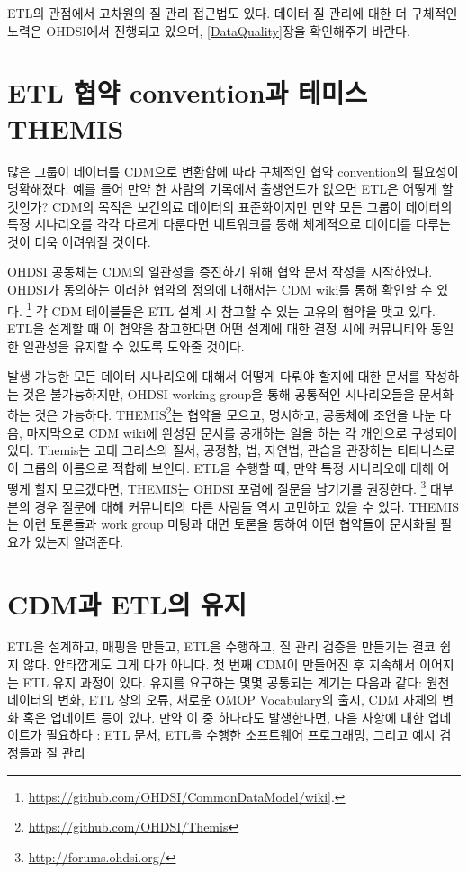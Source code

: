\documentclass[11pt]{book}
\let\rmarkdownfootnote\footnote%
\def\footnote{\protect\rmarkdownfootnote}
\theoremstyle{definition}
\theoremstyle{definition}
\theoremstyle{definition}
\theoremstyle{remark}
\begin{document}
ETL의 관점에서 고차원의 질 관리 접근법도 있다. 데이터 질 관리에 대한 더
구체적인 노력은 OHDSI에서 진행되고 있으며, \ref{DataQuality}장을
확인해주기 바란다.

\section{ETL 협약 convention과 테미스
THEMIS}\label{etl--convention--themis}

많은 그룹이 데이터를 CDM으로 변환함에 따라 구체적인 협약 convention의
필요성이 명확해졌다. 예를 들어 만약 한 사람의 기록에서 출생연도가 없으면
ETL은 어떻게 할 것인가? CDM의 목적은 보건의료 데이터의 표준화이지만 만약
모든 그룹이 데이터의 특정 시나리오를 각각 다르게 다룬다면 네트워크를
통해 체계적으로 데이터를 다루는 것이 더욱 어려워질 것이다.

OHDSI 공동체는 CDM의 일관성을 증진하기 위해 협약 문서 작성을 시작하였다.
OHDSI가 동의하는 이러한 협약의 정의에 대해서는 CDM wiki를 통해 확인할 수
있다. \footnote{\url{https://github.com/OHDSI/CommonDataModel/wiki}{]}.}
각 CDM 테이블들은 ETL 설계 시 참고할 수 있는 고유의 협약을 맺고 있다.
ETL을 설계할 때 이 협약을 참고한다면 어떤 설계에 대한 결정 시에
커뮤니티와 동일한 일관성을 유지할 수 있도록 도와줄 것이다.

발생 가능한 모든 데이터 시나리오에 대해서 어떻게 다뤄야 할지에 대한
문서를 작성하는 것은 불가능하지만, OHDSI working group을 통해 공통적인
시나리오들을 문서화하는 것은 가능하다. THEMIS\footnote{\url{https://github.com/OHDSI/Themis}}는
협약을 모으고, 명시하고, 공동체에 조언을 나눈 다음, 마지막으로 CDM
wiki에 완성된 문서를 공개하는 일을 하는 각 개인으로 구성되어 있다.
Themis는 고대 그리스의 질서, 공정함, 법, 자연법, 관습을 관장하는
티타니스로 이 그룹의 이름으로 적합해 보인다. ETL을 수행할 때, 만약 특정
시나리오에 대해 어떻게 할지 모르겠다면, THEMIS는 OHDSI 포럼에 질문을
남기기를 권장한다. \footnote{\url{http://forums.ohdsi.org/}} 대부분의
경우 질문에 대해 커뮤니티의 다른 사람들 역시 고민하고 있을 수 있다.
THEMIS는 이런 토론들과 work group 미팅과 대면 토론을 통하여 어떤
협약들이 문서화될 필요가 있는지 알려준다.

\section{CDM과 ETL의 유지}\label{CDMandETLMaintenance}

ETL을 설계하고, 매핑을 만들고, ETL을 수행하고, 질 관리 검증을 만들기는
결코 쉽지 않다. 안타깝게도 그게 다가 아니다. 첫 번째 CDM이 만들어진 후
지속해서 이어지는 ETL 유지 과정이 있다. 유지를 요구하는 몇몇 공통되는
계기는 다음과 같다: 원천 데이터의 변화, ETL 상의 오류, 새로운 OMOP
Vocabulary의 출시, CDM 자체의 변화 혹은 업데이트 등이 있다. 만약 이 중
하나라도 발생한다면, 다음 사항에 대한 업데이트가 필요하다 : ETL 문서,
ETL을 수행한 소프트웨어 프로그래밍, 그리고 예시 검정들과 질 관리
\end{document}

